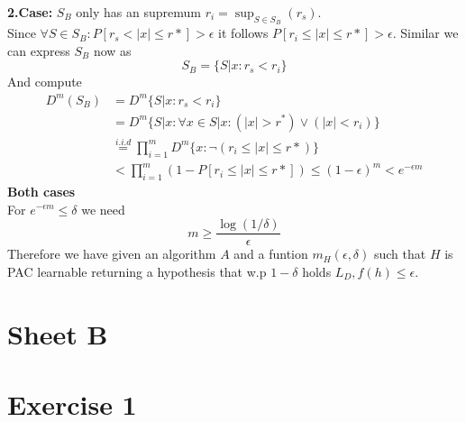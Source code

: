 \documentclass[12pt]{article}
\begin{document}
\textbf{2.Case:} $S_B$ only has an supremum  $r_i = \sup_{S \in S_B}(r_s)$.\\
Since $\forall S \in S_B:  P[r_s < |x| \leq r*] > \epsilon$ it follows $P[r_i \leq |x| \leq r*] > \epsilon$. Similar we can express $S_B$ now as 
\begin{equation*}
	S_B = \{S|x: r_s <r_i\}
\end{equation*}
And compute
\begin{align*}
	D^m(S_B) &= D^m \{S|x : r_s < r_i\}\\
	&= D^m \{S|x : \forall x \in S|x: (|x| > r^*) \lor (|x| < r_i)\} \\
	&\overset{i.i.d}{=} \prod_{i=1}^{m} D^m\{x: \neg (r_i \leq |x|\leq r*)\} \\
	&< \prod_{i=1}^{m} (1- P[r_i \leq |x| \leq r*]) \leq (1- \epsilon)^m < e^{-\epsilon m}
\end{align*}
\textbf{Both cases}\\
For $e^{-\epsilon m} \leq \delta$ we need
\begin{equation*}
	m \geq \frac{\log(1/\delta)}{\epsilon}
\end{equation*}
Therefore we have given an algorithm $A$ and a funtion $m_H(\epsilon,\delta)$ such that $H$ is PAC learnable returning a hypothesis that w.p $1-\delta$ holds $L_D,f(h) \leq \epsilon$.
\section*{Sheet B}
\section*{Exercise 1}
\end{document}
